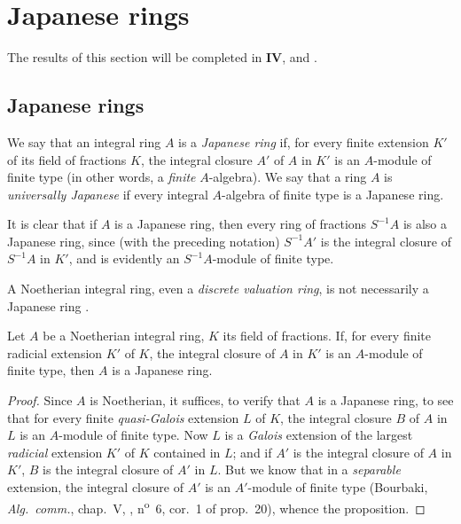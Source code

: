 \section{Japanese rings}
\label{section:0.23}

The results of this section will be completed in \textbf{IV},  and .

\subsection{Japanese rings}
\label{subsection:0.23.1}

\begin{definition}[23.1.1]
\label{0.23.1.1}
We say that an integral ring $A$ is a \emph{Japanese ring} if, for every finite extension $K'$ of its field of fractions $K$, the integral closure $A'$ of $A$ in $K'$ is
an $A$-module of finite type \textup{(in other words, a \emph{finite} $A$-algebra)}.
We say that a ring $A$ is \emph{universally Japanese} if every integral $A$-algebra of finite type is a Japanese ring.
\end{definition}

It is clear that if $A$ is a Japanese ring, then every ring of fractions $S^{-1}A$ is also a Japanese ring, since (with the preceding notation) $S^{-1}A'$ is the integral closure of $S^{-1}A$ in $K'$, and is evidently an $S^{-1}A$-module of finite type.

A Noetherian integral ring, even a \emph{discrete valuation ring}, is not necessarily a Japanese ring \cite{IV-30}.

\begin{proposition}[23.1.2]
\label{0.23.1.2}
Let $A$ be a Noetherian integral ring, $K$ its field of fractions.
If, for every finite \textup{radicial} extension $K'$ of $K$, the integral closure of $A$ in $K'$ is an $A$-module of finite type, then $A$ is a Japanese ring.
\end{proposition}

\begin{proof}
Since $A$ is Noetherian, it suffices, to verify that $A$ is a Japanese ring, to see that for every finite \emph{quasi-Galois} extension $L$ of $K$, the integral closure $B$ of $A$ in $L$ is an $A$-module of finite type.
Now $L$ is a \emph{Galois} extension of the largest \emph{radicial} extension $K'$ of $K$ contained in $L$; and if $A'$ is the integral closure of $A$ in $K'$, $B$ is the integral closure of $A'$ in $L$.
But we know that in a \emph{separable} extension, the integral closure of $A'$ is an $A'$-module of finite type (Bourbaki, \emph{Alg.~comm.}, chap.~V, , n\textsuperscript{o}~6, cor.~1 of prop.~20), whence the proposition.
\end{proof}

